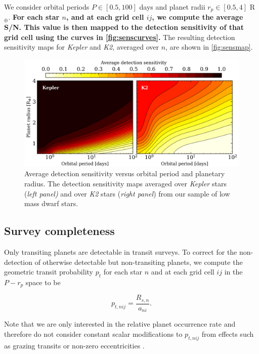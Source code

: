 \documentclass[twocolumn]{emulateapj}
\newcommand{\kepler}[1]{\emph{Kepler}#1}
\newcommand{\ktwo}[1]{\emph{K2}#1}
\begin{document}
We consider orbital periods $P \in [0.5,100]$ days and planet radii $r_p \in [0.5,4]$ R$_{\oplus}$.
\textbf{For each star
$n$, and at each grid cell $ij$, we compute the average S/N. This value is then mapped to the detection sensitivity
  of that grid cell
  using the curves in \autoref{fig:senscurves}.} The resulting detection sensitivity maps for \kepler{} and \ktwo{,}
averaged over $n$, are shown in \autoref{fig:sensmap}.

\begin{figure}
  \centering
  \includegraphics[width=0.98\hsize]{figures/sensmap.png}
  \caption{Average detection sensitivity versus orbital period and planetary radius.
    The detection sensitivity maps averaged over \kepler{} stars (\emph{left panel)} and over \ktwo{} stars
    (\emph{right panel}) from our sample of low mass dwarf stars.} 
  \label{fig:sensmap}
\end{figure}


\subsection{Survey completeness} \label{sect:comp}
Only transiting planets are detectable in transit surveys. To correct for the non-detection of otherwise
detectable but non-transiting planets, we compute
the geometric transit probability $p_t$ for each star $n$ and at each grid cell $ij$ in the $P-r_p$ space to be

\begin{equation}
  p_{t,nij} = \frac{R_{s,n}}{a_{ni}}. \label{eq:ptransit}
\end{equation}

\noindent Note that we are only interested in the relative planet occurrence rate and therefore do not consider
constant scalar modifications to $p_{t,nij}$ from effects such as grazing transits or non-zero eccentricities 
\citep{barnes07b}.
\end{document}
